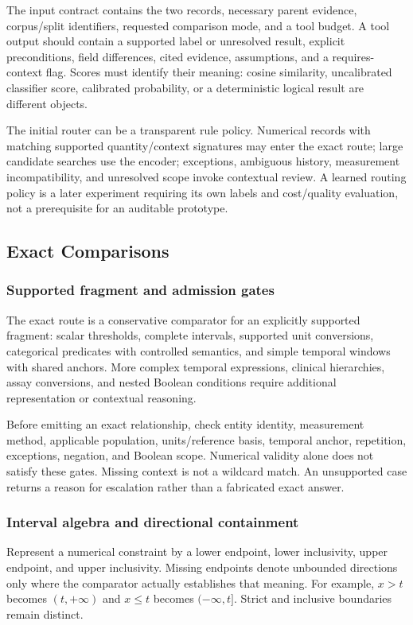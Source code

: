 \documentclass[10pt,letterpaper]{article}
\begin{document}
The input contract contains the two records, necessary parent evidence,
corpus/split identifiers, requested comparison mode, and a tool budget. A
tool output should contain a supported label or unresolved result, explicit
preconditions, field differences, cited evidence, assumptions, and a
requires-context flag. Scores must identify their meaning: cosine similarity,
uncalibrated classifier score, calibrated probability, or a deterministic
logical result are different objects.

The initial router can be a transparent rule policy. Numerical records with
matching supported quantity/context signatures may enter the exact route;
large candidate searches use the encoder; exceptions, ambiguous history,
measurement incompatibility, and unresolved scope invoke contextual review.
A learned routing policy is a later experiment requiring its own labels and
cost/quality evaluation, not a prerequisite for an auditable prototype.

\subsection{Exact Comparisons}
\label{sec:exact}

\subsubsection{Supported fragment and admission gates}
The exact route is a conservative comparator for an explicitly supported
fragment: scalar thresholds, complete intervals, supported unit conversions,
categorical predicates with controlled semantics, and simple temporal windows
with shared anchors. More complex temporal expressions, clinical
hierarchies, assay conversions, and nested Boolean conditions require
additional representation or contextual reasoning.

Before emitting an exact relationship, check entity identity, measurement
method, applicable population, units/reference basis, temporal anchor,
repetition, exceptions, negation, and Boolean scope. Numerical validity alone
does not satisfy these gates. Missing context is not a wildcard match.
An unsupported case returns a reason for escalation rather than a fabricated
exact answer.

\subsubsection{Interval algebra and directional containment}
Represent a numerical constraint by a lower endpoint, lower inclusivity,
upper endpoint, and upper inclusivity. Missing endpoints denote unbounded
directions only where the comparator actually establishes that meaning.
For example, $x>t$ becomes $(t,+\infty)$ and $x\leq t$ becomes
$(-\infty,t]$. Strict and inclusive boundaries remain distinct.
\end{document}
